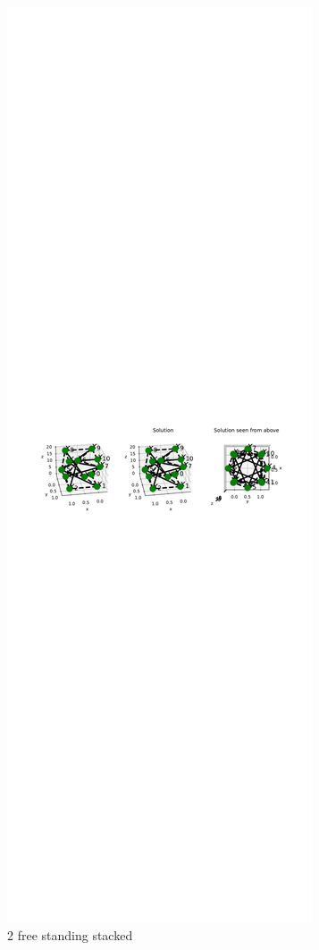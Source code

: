 \begin{figure}
    \centering
\includegraphics[width=0.6\columnwidth]{Bilder/2FREESTANDING.pdf}
    \caption{2 free standing stacked}
    \label{fig:2freestanding}
\end{figure}


